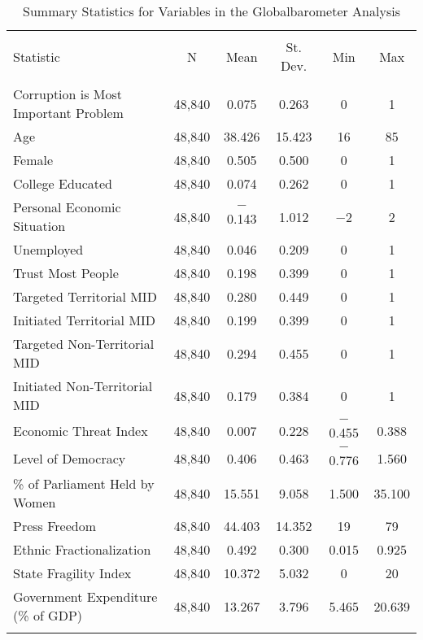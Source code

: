 \documentclass[11pt,]{article}
\begin{document}
\begin{table}[!htbp] \centering 
  \caption{Summary Statistics for Variables in the Globalbarometer Analysis} 
  \label{tab:summarygb} 
\begin{tabular}{@{\extracolsep{5pt}}lccccc} 
\\[-1.8ex]\hline 
\hline \\[-1.8ex] 
Statistic & \multicolumn{1}{c}{N} & \multicolumn{1}{c}{Mean} & \multicolumn{1}{c}{St. Dev.} & \multicolumn{1}{c}{Min} & \multicolumn{1}{c}{Max} \\ 
\hline \\[-1.8ex] 
Corruption is Most Important Problem & 48,840 & 0.075 & 0.263 & 0 & 1 \\ 
Age & 48,840 & 38.426 & 15.423 & 16 & 85 \\ 
Female & 48,840 & 0.505 & 0.500 & 0 & 1 \\ 
College Educated & 48,840 & 0.074 & 0.262 & 0 & 1 \\ 
Personal Economic Situation & 48,840 & $-$0.143 & 1.012 & $-$2 & 2 \\ 
Unemployed & 48,840 & 0.046 & 0.209 & 0 & 1 \\ 
Trust Most People & 48,840 & 0.198 & 0.399 & 0 & 1 \\ 
Targeted Territorial MID & 48,840 & 0.280 & 0.449 & 0 & 1 \\ 
Initiated Territorial MID & 48,840 & 0.199 & 0.399 & 0 & 1 \\ 
Targeted Non-Territorial MID & 48,840 & 0.294 & 0.455 & 0 & 1 \\ 
Initiated Non-Territorial MID & 48,840 & 0.179 & 0.384 & 0 & 1 \\ 
Economic Threat Index & 48,840 & 0.007 & 0.228 & $-$0.455 & 0.388 \\ 
Level of Democracy & 48,840 & 0.406 & 0.463 & $-$0.776 & 1.560 \\ 
\% of Parliament Held by Women & 48,840 & 15.551 & 9.058 & 1.500 & 35.100 \\ 
Press Freedom & 48,840 & 44.403 & 14.352 & 19 & 79 \\ 
Ethnic Fractionalization & 48,840 & 0.492 & 0.300 & 0.015 & 0.925 \\ 
State Fragility Index & 48,840 & 10.372 & 5.032 & 0 & 20 \\ 
Government Expenditure (\% of GDP) & 48,840 & 13.267 & 3.796 & 5.465 & 20.639 \\ 
\hline \\[-1.8ex] 
\end{tabular} 
\end{table}
\end{document}

